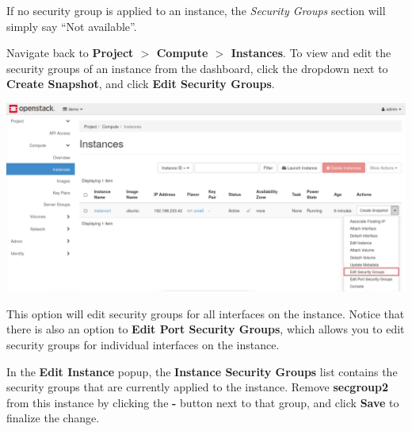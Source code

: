 \documentclass[letterpaper, 12pt]{article}
\begin{document}
\begin{enumerate}
    \begin{notebox}
        If no security group is applied to an instance, the \textit{Security Groups} section will simply say ``Not available''.
    \end{notebox}

    \begin{labstep}\label{it:secgroup}
        Navigate back to \textbf{Project $>$ Compute $>$ Instances}.
        To view and edit the security groups of an instance from the dashboard, click the dropdown next to \textbf{Create Snapshot}, and click \textbf{Edit Security Groups}.

        \begin{center}
            \includegraphics[width=\linewidth]{images/part6/step18.png}
        \end{center}
    \end{labstep}

    \begin{notebox}
        This option will edit security groups for all interfaces on the instance.
        Notice that there is also an option to \textbf{Edit Port Security Groups}, which allows you to edit security groups for individual interfaces on the instance.
    \end{notebox}

    \begin{labstep}
        In the \textbf{Edit Instance} popup, the \textbf{Instance Security Groups} list contains the security groups that are currently applied to the instance.
        Remove \textbf{secgroup2} from this instance by clicking the \textbf{-} button next to that group, and click \textbf{Save} to finalize the change.


\end{labstep}
\end{enumerate}
\end{document}
